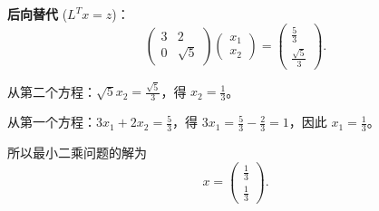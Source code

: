 \documentclass{article}
\begin{document}
\begin{solution}
  \textbf{后向替代} ($L^T x = z$)：
  \[
    \begin{pmatrix} 3 & 2 \\ 0 & \sqrt{5}
    \end{pmatrix}
    \begin{pmatrix} x_1 \\ x_2
    \end{pmatrix}
    =
    \begin{pmatrix} \frac{5}{3} \\ \frac{\sqrt{5}}{3}
    \end{pmatrix}.
  \]

  从第二个方程：$\sqrt{5}x_2 = \frac{\sqrt{5}}{3}$，得 $x_2 = \frac{1}{3}$。

  从第一个方程：$3x_1 + 2x_2 = \frac{5}{3}$，得 $3x_1 = \frac{5}{3} -
  \frac{2}{3} = 1$，因此 $x_1 = \frac{1}{3}$。

  所以最小二乘问题的解为
  \[
    x =
    \begin{pmatrix} \frac{1}{3} \\ \frac{1}{3}
    \end{pmatrix}.
  \]

\end{solution}
\end{document}
